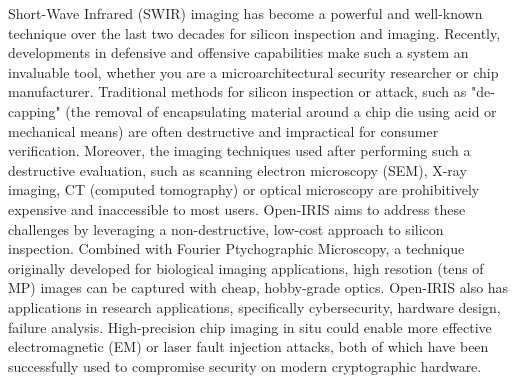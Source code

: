 %
%

Short-Wave Infrared (SWIR) imaging has become a powerful and well-known technique over the last two decades for silicon inspection and imaging. Recently, developments in defensive and offensive capabilities make such a system an invaluable tool, whether you are a microarchitectural security researcher or chip manufacturer. Traditional methods for silicon inspection or attack, such as "de-capping" (the removal of encapsulating material around a chip die using acid or mechanical means) are often destructive and impractical for consumer verification. Moreover, the imaging techniques used after performing such a destructive evaluation, such as scanning electron microscopy (SEM), X-ray imaging, CT (computed tomography) or optical microscopy are prohibitively expensive and inaccessible to most users. Open-IRIS aims to address these challenges by leveraging a non-destructive, low-cost approach to silicon inspection. Combined with Fourier Ptychographic Microscopy, a technique originally developed for biological imaging applications, high resotion (tens of MP) images can be captured with cheap, hobby-grade optics. Open-IRIS also has applications in research applications, specifically cybersecurity, hardware design, failure analysis. High-precision chip imaging in situ could enable more effective electromagnetic (EM) or laser fault injection attacks, both of which have been successfully used to compromise security on modern cryptographic hardware.